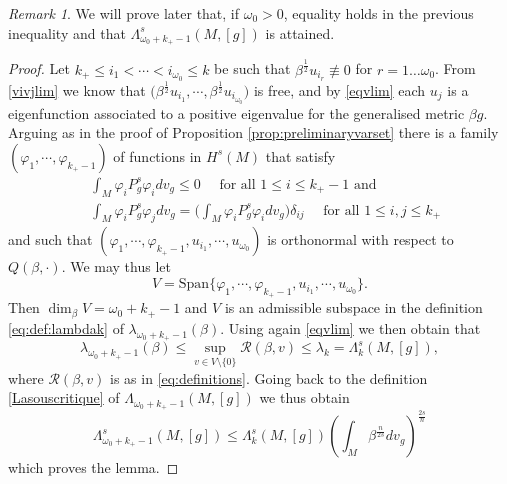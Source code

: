 \documentclass[10pt]{amsart}
\numberwithin{equation}{section}
\def\La{{\Lambda}}
\def\be{{\beta}}
\def\la{{\lambda}}
\def\Vol{{\mathop{\rm Vol}}}
\newcommand{\vp}{\varphi}
\theoremstyle{plain}
\theoremstyle{remark}
\newtheorem{rem}{Remark}[section]
\begin{document}
\begin{rem}
 We will prove later that, if $\omega_0 >0$, equality holds in the previous inequality and that $\La_{\omega_0+k_+-1}^s(M,[g])$ is attained. 
\end{rem}


\begin{proof}
Let $k_+ \leq i_1 < \cdots <i_{\omega_0} \le k $ be such that $\beta^{\frac{1}{2}} u_{i_r} \not\equiv 0$ for $r = 1 \dots \omega_0$. From \eqref{vivjlim} we know that $\big( \beta^{\frac12} u_{i_1},\cdots, \beta^{\frac12} u_{i_{\omega_0}} \big)$ is free, and by \eqref{eqvlim} each $u_j$ is a eigenfunction associated to a positive eigenvalue for the generalised metric $\beta g$. Arguing as in the proof of Proposition \ref{prop:preliminaryvarset}  there is a family $(\vp_1, \cdots, \vp_{k_+-1})$ of functions in $H^s(M)$ that satisfy 
  $$ \begin{aligned}
  &   \int_M \vp_i P_g^s \vp_i dv_g \le 0 \quad \text{ for all } 1 \le i \le k_+-1 \text{ and } \\
  &   \int_M \vp_i  P_g^s \vp_j dv_g = \Big(\int_M \vp_i P_g^s \vp_i dv_g\Big) \delta_{ij}  \quad \text{ for all } 1 \le i,j \le k_+
    \end{aligned} $$ 
and such that $(\vp_1, \cdots, \vp_{k_+-1}, u_{i_1}, \cdots, u_{\omega_0})$  is orthonormal with respect to $Q(\beta,\cdot)$. We may thus let 
$$ V = \text{Span} \big\{ \vp_1, \cdots, \vp_{k_+-1}, u_{i_1}, \cdots, u_{\omega_0}\big\}. $$
Then $\dim_{\beta} V =\omega_0 + k_+-1$ and $V$ is an admissible subspace in the definition \eqref{eq:def:lambdak} of $\lambda_{\omega_0 + k_+-1}(\beta)$. Using again \eqref{eqvlim} we then obtain that 
\begin{equation} \label{eq:lambda:bulk}
 \lambda_{\omega_0+k_+- 1}(\beta) \le \sup_{v \in V \setminus \{0\}} \mathcal{R}(\beta,v) \le \lambda_k =   \La_k^s(M,[g]),
 \end{equation}
where $\mathcal{R}(\beta,v)$ is as in \eqref{eq:definitions}. Going back to the definition \eqref{Lasouscritique} of $\Lambda_{\omega_0 + k_+-1}(M,[g])$ we thus obtain  
$$ \La_{\omega_0+k_+-1}^s(M,[g]) \le  %
\Lambda_k^s(M,[g])  \left( \int_M \beta^\frac{n}{2s} dv_g \right)^{\frac{2s}{n}}$$
which proves the lemma. 
\end{proof}
\end{document}
